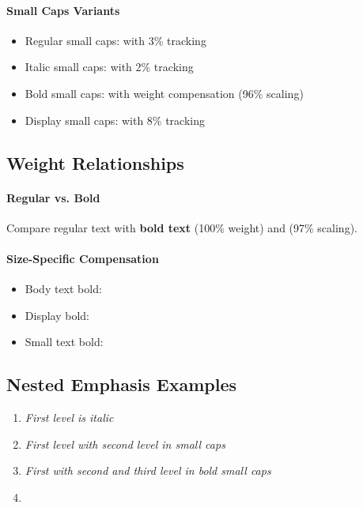 \documentclass{article}
\begin{document}
\paragraph{Small Caps Variants}
\begin{itemize}
\item Regular small caps:  with 3\% tracking
\item Italic small caps:  with 2\% tracking  
\item Bold small caps:  with weight compensation (96\% scaling)
\item Display small caps:  with 8\% tracking
\end{itemize}

\subsection{Weight Relationships}

\paragraph{Regular vs. Bold}
Compare regular text with \textbf{bold text} (100\% weight) and  (97\% scaling).

\paragraph{Size-Specific Compensation}
\begin{itemize}
\item Body text bold: 
\item Display bold:  
\item Small text bold: 
\end{itemize}

\subsection{Nested Emphasis Examples}

\begin{enumerate}
\item \emph{First level is italic}
\item \emph{First level with \emph{second level} in small caps}
\item \emph{First with \emph{second and \emph{third level}} in bold small caps}
\item {}
\end{enumerate}
\end{document}
